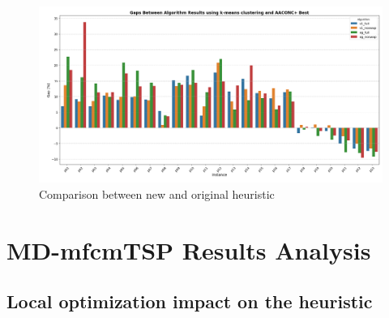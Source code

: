 \documentclass{article}
\begin{document}
	\begin{figure}[hb!]
		\centering
		\caption{Comparison between new and original heuristic}
		\includegraphics[width=\textwidth]{heuristics_comp_gaps_barGraph_kmeans}
	\end{figure}
	
	
	
	\clearpage
	\section{MD-mfcmTSP Results Analysis}
	\subsection{Local optimization impact on the heuristic}
\end{document}
